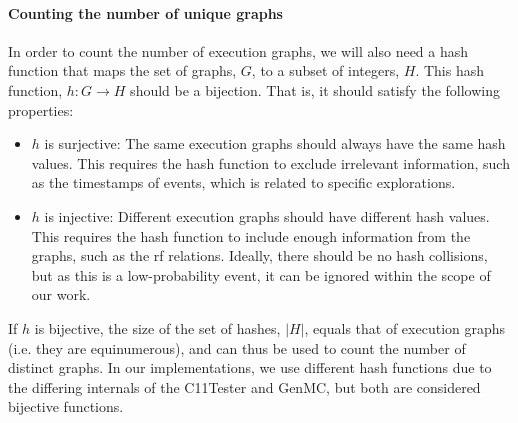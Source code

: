 \paragraph*{Counting the number of unique graphs} In order to count the number of execution graphs, we will also need a hash function that maps the set of graphs, $G$, to a subset of integers, $H$. This hash function, $h: G \to H$ should be a bijection. That is, it should satisfy the following properties:
\begin{itemize}
    \item $h$ is surjective: The same execution graphs should always have the same hash values. This requires the hash function to exclude irrelevant information, such as the timestamps of events, which is related to specific explorations. 
	\item $h$ is injective: Different execution graphs should have different hash values. This requires the hash function to include enough information from the graphs, such as the rf relations. Ideally, there should be no hash collisions, but as this is a low-probability event, it can be ignored within the scope of our work.
\end{itemize}

If $h$ is bijective, the size of the set of hashes, $|H|$, equals that of execution graphs (i.e. they are equinumerous), and can thus be used to count the number of distinct graphs. In our implementations, we use different hash functions due to the differing internals of the C11Tester and GenMC, but both are considered bijective functions.


